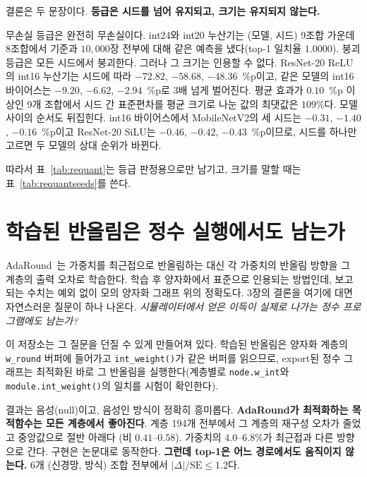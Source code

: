 \documentclass[11pt,a4paper,oneside]{report}
\newcommand{\fittable}[1]{\adjustbox{max width=\textwidth}{#1}}
\begin{document}
결론은 두 문장이다. \textbf{등급은 시드를 넘어 유지되고, 크기는 유지되지 않는다.}

무손실 등급은 완전히 무손실이다. int24와 int20 누산기는 (모델, 시드) 9조합 가운데 8조합에서 기준과
$10{,}000$장 전부에 대해 같은 예측을 냈다(top-1 일치율 $1.0000$). 붕괴 등급은 모든 시드에서 붕괴한다.
그러나 그 크기는 인용할 수 없다. ResNet-20 ReLU의 int16 누산기는 시드에 따라 $-72.82$, $-58.68$,
$-48.36$~\%p이고, 같은 모델의 int16 바이어스는 $-9.20$, $-6.62$, $-2.94$~\%p로 3배 넘게 벌어진다.
평균 효과가 $0.10$~\%p 이상인 9개 조합에서 시드 간 표준편차를 평균 크기로 나눈 값의 최댓값은 $109\%$다.
모델 사이의 순서도 뒤집힌다. int16 바이어스에서 MobileNetV2의 세 시드는 $-0.31$, $-1.40$, $-0.16$~\%p이고
ResNet-20 SiLU는 $-0.46$, $-0.42$, $-0.43$~\%p이므로, 시드를 하나만 고르면 두 모델의 상대 순위가 바뀐다.

따라서 표~\ref{tab:requant}는 등급 판정용으로만 남기고, 크기를 말할 때는
표~\ref{tab:requantseeds}를 쓴다.

\section{학습된 반올림은 정수 실행에서도 남는가}

AdaRound~\cite{adaround}는 가중치를 최근접으로 반올림하는 대신 각 가중치의 반올림 방향을 그 계층의 출력
오차로 학습한다. 학습 후 양자화에서 표준으로 인용되는 방법인데, 보고되는 수치는 예외 없이 모의 양자화
그래프 위의 정확도다. 3장의 결론을 여기에 대면 자연스러운 질문이 하나 나온다. \emph{시뮬레이터에서 얻은
이득이 실제로 나가는 정수 프로그램에도 남는가?}

이 저장소는 그 질문을 던질 수 있게 만들어져 있다. 학습된 반올림은 양자화 계층의 \texttt{w\_round} 버퍼에
들어가고 \texttt{int\_weight()}가 같은 버퍼를 읽으므로, export된 정수 그래프는 최적화된 바로 그 반올림을
실행한다(계층별로 \texttt{node.w\_int}와 \texttt{module.int\_weight()}의 일치를 시험이 확인한다).

\begin{table}[!t]
\caption[AdaRound: 모의 경로와 정수 경로]{AdaRound 대 최근접 반올림. ``재구성 오차비''는 계층별 상대
재구성 오차의 AdaRound/최근접 비의 중앙값(작을수록 좋다), ``방향 반전''은 최근접과 다른 쪽을 고른 가중치의
비율, 이득은 같은 이미지에서 최근접 반올림과 비교한 쌍 차이 $\pm$ 쌍 표준오차다. test 분할 전체
$10{,}000$장, AdaRound $1{,}500$ iteration.}
\label{tab:adaround}
\centering
\small
\fittable{}
\end{table}

결과는 음성(null)이고, 음성인 방식이 정확히 흥미롭다. \textbf{AdaRound가 최적화하는 목적함수는 모든
계층에서 좋아진다}. 계층 194개 전부에서 그 계층의 재구성 오차가 줄었고 중앙값으로 절반 아래다
(비 $0.41$--$0.58$). 가중치의 $4.0$--$6.8\%$가 최근접과 다른 방향으로 간다. 구현은 논문대로 동작한다.
\textbf{그런데 top-1은 어느 경로에서도 움직이지 않는다.} 6개 (신경망, 방식) 조합 전부에서
$|\Delta|/\mathrm{SE} \le 1.2$다.
\end{document}
